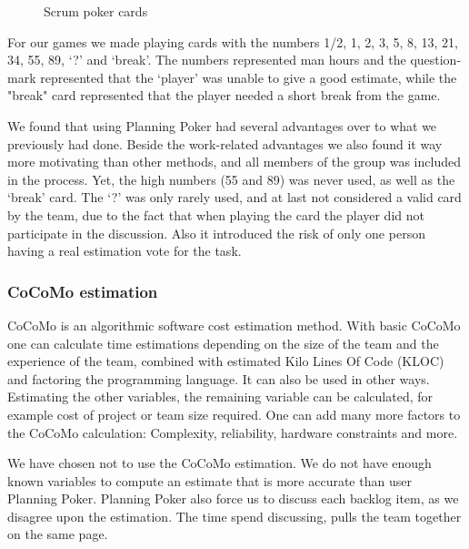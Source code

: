 \begin{figure}[H]
  \caption{Scrum poker cards}
  \label{scrumPokerCards}
\end{figure}

For our games we made playing cards with the numbers 1/2, 1, 2, 3, 5, 8, 13, 21, 34, 55, 89, `?' and `break'. The numbers represented man hours and the question-mark represented that the `player' was unable to give a good estimate, while the "break" card represented that the player needed a short break from the game.

We found that using Planning Poker had several advantages over to what we previously had done. Beside the work-related advantages we also found it way more motivating than other methods, and all members of the group was included in the process. Yet, the high numbers (55 and 89) was never used, as well as the `break' card. The `?' was only rarely used, and at last not considered a valid card by the team, due to the fact that when playing the card the player did not participate in the discussion. Also it introduced the risk of only one person having a real estimation vote for the task.

\subsubsection{CoCoMo estimation}
CoCoMo is an algorithmic software cost estimation method. With basic CoCoMo one can calculate time estimations depending on the size of the team and the experience of the team, combined with estimated Kilo Lines Of Code (KLOC) and factoring the programming language. It can also be used in other ways. Estimating the other variables, the remaining variable can be calculated, for example cost of project or team size required. One can add many more factors to the CoCoMo calculation: Complexity, reliability, hardware constraints and more.

We have chosen not to use the CoCoMo estimation. We do not have enough known variables to compute an estimate that is more accurate than user Planning Poker. Planning Poker also force us to discuss each backlog item, as we disagree upon the estimation. The time spend discussing, pulls the team together on the same page. 

